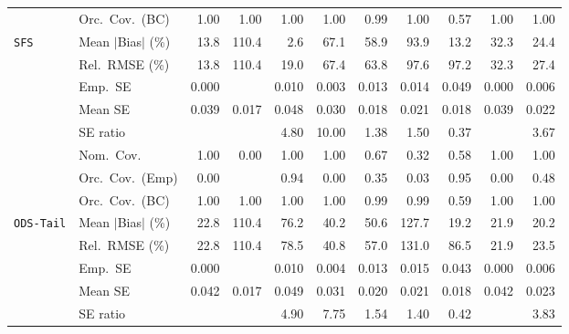 \begin{landscape}
\begin{longtable}{llrrrrrrrrr}
 & Orc.\ Cov.\ (BC) & \cellcolor{ranktwo}1.00 & \cellcolor{ranktwo}1.00 & \cellcolor{ranktwo}1.00 & \cellcolor{ranktwo}1.00 & \cellcolor{rankone}0.99 & \cellcolor{ranktwo}1.00 & \cellcolor{rankthree}0.57 & \cellcolor{ranktwo}1.00 & \cellcolor{ranktwo}1.00 \\
\addlinespace[2pt]
\quad \texttt{SFS} & Mean $|$Bias$|$ (\%) & \cellcolor{rankthree}13.8 & 110.4 & \cellcolor{rankone}2.6 & 67.1 & 58.9 & 93.9 & \cellcolor{ranktwo}13.2 & 32.3 & 24.4 \\
 & Rel.\ RMSE (\%) & \cellcolor{rankone}13.8 & 110.4 & \cellcolor{ranktwo}19.0 & 67.4 & 63.8 & 97.6 & 97.2 & 32.3 & \cellcolor{rankthree}27.4 \\
 & Emp.\ SE & 0.000 &  & 0.010 & 0.003 & 0.013 & 0.014 & 0.049 & 0.000 & 0.006 \\
 & Mean SE & 0.039 & 0.017 & 0.048 & 0.030 & 0.018 & 0.021 & 0.018 & 0.039 & 0.022 \\
 & SE ratio &  &  & 4.80 & 10.00 & \cellcolor{rankone}1.38 & \cellcolor{ranktwo}1.50 & \cellcolor{rankthree}0.37 &  & 3.67 \\
 & Nom.\ Cov. & \cellcolor{rankone}1.00 & 0.00 & \cellcolor{rankone}1.00 & \cellcolor{rankone}1.00 & \cellcolor{ranktwo}0.67 & 0.32 & \cellcolor{rankthree}0.58 & \cellcolor{rankone}1.00 & \cellcolor{rankone}1.00 \\
 & Orc.\ Cov.\ (Emp) & 0.00 &  & \cellcolor{ranktwo}0.94 & 0.00 & 0.35 & 0.03 & \cellcolor{rankone}0.95 & 0.00 & \cellcolor{rankthree}0.48 \\
 & Orc.\ Cov.\ (BC) & \cellcolor{ranktwo}1.00 & \cellcolor{ranktwo}1.00 & \cellcolor{ranktwo}1.00 & \cellcolor{ranktwo}1.00 & \cellcolor{rankone}0.99 & \cellcolor{rankone}0.99 & \cellcolor{rankthree}0.59 & \cellcolor{ranktwo}1.00 & \cellcolor{ranktwo}1.00 \\
\addlinespace[2pt]
\quad \texttt{ODS-Tail} & Mean $|$Bias$|$ (\%) & 22.8 & 110.4 & 76.2 & 40.2 & 50.6 & 127.7 & \cellcolor{rankone}19.2 & \cellcolor{rankthree}21.9 & \cellcolor{ranktwo}20.2 \\
 & Rel.\ RMSE (\%) & \cellcolor{ranktwo}22.8 & 110.4 & 78.5 & 40.8 & 57.0 & 131.0 & 86.5 & \cellcolor{rankone}21.9 & \cellcolor{rankthree}23.5 \\
 & Emp.\ SE & 0.000 &  & 0.010 & 0.004 & 0.013 & 0.015 & 0.043 & 0.000 & 0.006 \\
 & Mean SE & 0.042 & 0.017 & 0.049 & 0.031 & 0.020 & 0.021 & 0.018 & 0.042 & 0.023 \\
 & SE ratio &  &  & 4.90 & 7.75 & \cellcolor{ranktwo}1.54 & \cellcolor{rankone}1.40 & \cellcolor{rankthree}0.42 &  & 3.83 \\

\end{longtable}
\end{landscape}
